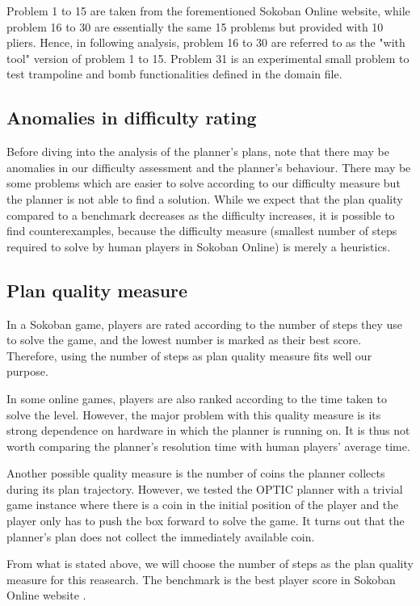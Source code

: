 \documentclass[letterpaper]{article} %
\begin{document}
Problem 1 to 15 are taken from the forementioned Sokoban Online website, while problem 16
to 30 are essentially the same 15 problems but provided with 10 pliers. Hence, in following
analysis, problem 16 to 30 are referred to as the "with tool" version of problem 1 to 15.
Problem 31 is an experimental small problem to test trampoline and bomb functionalities
defined in the domain file.

\subsection{Anomalies in difficulty rating}
Before diving into the analysis of the planner's plans, note
that there may be anomalies in our difficulty assessment
and the planner's behaviour. There may be some problems
which are easier to solve according to our difficulty measure but
the planner is not able to find a solution. While we expect
that the plan quality compared to a benchmark decreases as the
difficulty increases, it is possible to find counterexamples,
because the difficulty measure (smallest
number of steps required to solve by human players in Sokoban Online)
is merely a heuristics.

\subsection{Plan quality measure}
In a Sokoban game, players are rated according to the number
of steps they use to solve the game, and the lowest number
is marked as their best score. Therefore, using the number of steps
as plan quality measure fits well our purpose.

In some online games, players are also ranked according to
the time taken to solve the level. However, the major problem
with this quality measure is its strong dependence
on hardware in which the planner is running on.
It is thus not worth comparing the planner's resolution time
with human players' average time.

Another possible quality measure is the number of coins the
planner collects during its plan trajectory. However, we tested
the OPTIC planner with a trivial game instance where there is a
coin in the initial position of the player and the player only
has to push the box forward to solve the game. It turns out that
the planner's plan does not collect the immediately available coin.

From what is stated above, we will choose the number of steps
as the plan quality measure for this reasearch.
The benchmark is the best player score in Sokoban Online website \cite{microban}.
\end{document}
